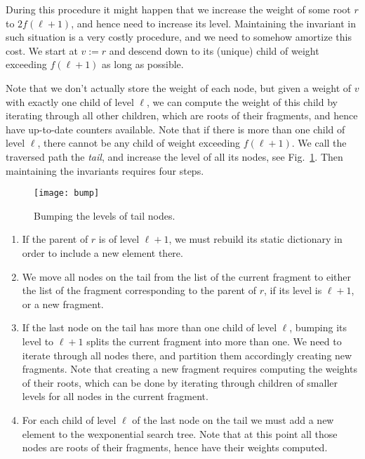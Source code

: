 \documentclass[11pt,onecolumn,final]{article} \usepackage{a4}
\theoremstyle{plain}
\theoremstyle{remark}
\begin{document}
During this procedure it might happen that we increase the weight of some root $r$ to $2f(\ell+1)$, and hence need to increase its level. Maintaining the invariant in such situation is a very costly procedure, and we need to somehow amortize this cost. We start at $v:=r$ and descend down to its (unique) child of weight exceeding $f(\ell+1)$ as long as possible.

Note that we don't actually store the weight of each node, but given a weight of $v$ with exactly one child of level $\ell$, we can compute the weight of this child
by iterating through all other children, which are roots of their fragments, and hence have up-to-date counters available. Note that if there is more than one child of level $\ell$, there cannot be any child of weight exceeding $f(\ell+1)$. We call the traversed path the \emph{tail}, and increase the level of all its nodes, see Fig.~\ref{fig:tail}. Then maintaining the invariants requires four steps.

\begin{figure}
\centering
\texttt{[image: bump]}
\caption{Bumping the levels of tail nodes.}
\label{fig:tail}
\end{figure}

\begin{enumerate}
\item If the parent of $r$ is of level $\ell+1$, we must rebuild its static dictionary in order to include a new element there.
\item We move all nodes on the tail from the list of the current fragment to either the list of the fragment corresponding to the parent of $r$, if its level is $\ell+1$, or a new fragment.
\item If the last node on the tail has more than one child of level $\ell$, bumping its level to $\ell+1$ splits the current fragment into more than one. We need to iterate through all nodes there, and partition them accordingly creating new fragments. Note that creating a new fragment requires computing the weights of their roots, which can be done by iterating through children of smaller levels for all nodes in the current fragment.
\item For each child of level $\ell$ of the last node on the tail we must add a new element to the wexponential search tree. Note that at this point all those nodes are roots of their fragments, hence have their weights computed.
\end{enumerate}
\end{document}
